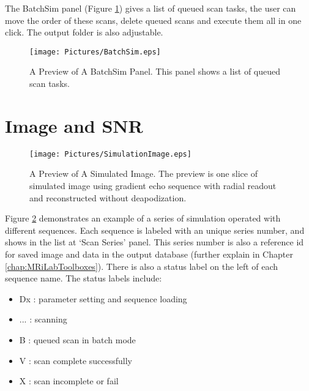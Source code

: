 \documentclass{book}%
\begin{document}
The BatchSim panel (Figure \ref{fig:BatchSim}) gives a list of queued scan tasks, the user can move the order of these scans, delete queued scans and execute them all in one click. The output folder is also adjustable.

\begin{figure}[htbp]
	\centering
		\texttt{[image: Pictures/BatchSim.eps]}
	\caption{A Preview of A BatchSim Panel. This panel shows a list of queued scan tasks. }
	\label{fig:BatchSim}
\end{figure}


\section{Image and SNR}

\begin{figure}[htbp]
	\centering
		\texttt{[image: Pictures/SimulationImage.eps]}
	\caption{A Preview of A Simulated Image. The preview is one slice of simulated image using gradient echo sequence with radial readout and reconstructed without deapodization.}
	\label{fig:SimulationImage}
\end{figure}

Figure \ref{fig:SimulationImage} demonstrates an example of a series of simulation operated with different sequences. Each sequence is labeled with an unique series number, and shows in the list at `Scan Series' panel. This series number is also a reference id for saved image and data in the output database (further explain in Chapter \ref{chap:MRiLabToolboxes}). There is also a status label on the left of each sequence name. The status labels include:

\begin{itemize}
	\item Dx : parameter setting and sequence loading
	\item ... : scanning
	\item B : queued scan in batch mode
	\item V :  scan complete successfully
	\item X : scan incomplete or fail
\end{itemize}
\end{document}
